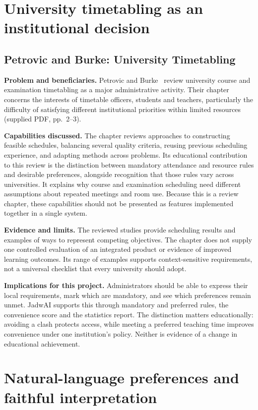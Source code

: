 \section{University timetabling as an institutional decision}
\subsection{Petrovic and Burke: University Timetabling}
\textbf{Problem and beneficiaries.} Petrovic and Burke~\cite{petrovic2004university} review university course and examination timetabling as a major administrative activity. Their chapter concerns the interests of timetable officers, students and teachers, particularly the difficulty of satisfying different institutional priorities within limited resources (supplied PDF, pp.~2--3).

\textbf{Capabilities discussed.} The chapter reviews approaches to constructing feasible schedules, balancing several quality criteria, reusing previous scheduling experience, and adapting methods across problems. Its educational contribution to this review is the distinction between mandatory attendance and resource rules and desirable preferences, alongside recognition that those rules vary across universities. It explains why course and examination scheduling need different assumptions about repeated meetings and room use. Because this is a review chapter, these capabilities should not be presented as features implemented together in a single system.

\textbf{Evidence and limits.} The reviewed studies provide scheduling results and examples of ways to represent competing objectives. The chapter does not supply one controlled evaluation of an integrated product or evidence of improved learning outcomes. Its range of examples supports context-sensitive requirements, not a universal checklist that every university should adopt.

\textbf{Implications for this project.} Administrators should be able to express their local requirements, mark which are mandatory, and see which preferences remain unmet. JadwAI supports this through mandatory and preferred rules, the convenience score and the statistics report. The distinction matters educationally: avoiding a clash protects access, while meeting a preferred teaching time improves convenience under one institution's policy. Neither is evidence of a change in educational achievement.

\section{Natural-language preferences and faithful interpretation}
